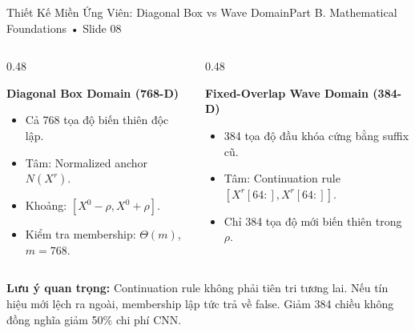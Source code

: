 \documentclass[aspectratio=169, 10pt]{beamer}
\begin{document}
\begin{frame}{Thiết Kế Miền Ứng Viên: Diagonal Box vs Wave Domain}{Part B. Mathematical Foundations • Slide 08}
    \begin{columns}
        \begin{column}{0.48\textwidth}
            \begin{block}{\textbf{Diagonal Box Domain (768-D)}}
                \small
                \begin{itemize}
                    \item Cả 768 tọa độ biến thiên độc lập.
                    \item Tâm: Normalized anchor $N(X^r)$.
                    \item Khoảng: $[X^0 - \rho, X^0 + \rho]$.
                    \item Kiểm tra membership: $\Theta(m)$, $m=768$.
                \end{itemize}
            \end{block}
        \end{column}
        \begin{column}{0.48\textwidth}
            \begin{block}{\textbf{Fixed-Overlap Wave Domain (384-D)}}
                \small
                \begin{itemize}
                    \item 384 tọa độ đầu khóa cứng bằng suffix cũ.
                    \item Tâm: Continuation rule $[X^r[64:], X^r[64:]]$.
                    \item Chỉ 384 tọa độ mới biến thiên trong $\rho$.
                \end{itemize}
            \end{block}
        \end{column}
    \end{columns}
    \vspace{0.3cm}
    \centering
    \alert{\textbf{Lưu ý quan trọng:}} Continuation rule không phải tiên tri tương lai. Nếu tín hiệu mới lệch ra ngoài, membership lập tức trả về false. Giảm 384 chiều không đồng nghĩa giảm 50\% chi phí CNN.
\end{frame}
\end{document}

